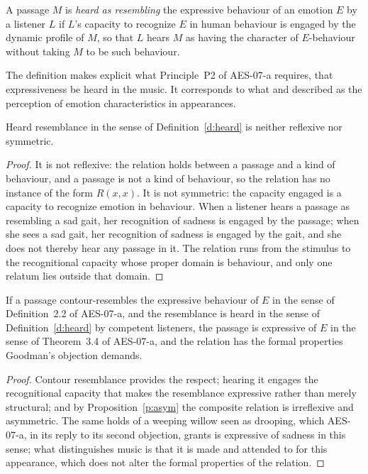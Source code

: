 \documentclass{situationist-preprint}
\begin{document}
\begin{definition}\label{d:heard}
A passage $M$ is \emph{heard as resembling} the expressive behaviour of an emotion $E$ by a listener $L$ if $L$'s capacity to recognize $E$ in human behaviour is engaged by the dynamic profile of $M$, so that $L$ hears $M$ as having the character of $E$-behaviour without taking $M$ to be such behaviour.
\end{definition}

The definition makes explicit what Principle~P2 of AES-07-a requires, that expressiveness be heard in the music. It corresponds to what \citet{Kivy1980} and \citet{SDavies1994} described as the perception of emotion characteristics in appearances.

\begin{proposition}\label{p:asym}
Heard resemblance in the sense of Definition~\ref{d:heard} is neither reflexive nor symmetric.
\end{proposition}

\begin{proof}
It is not reflexive: the relation holds between a passage and a kind of behaviour, and a passage is not a kind of behaviour, so the relation has no instance of the form $R(x,x)$. It is not symmetric: the capacity engaged is a capacity to recognize emotion in behaviour. When a listener hears a passage as resembling a sad gait, her recognition of sadness is engaged by the passage; when she sees a sad gait, her recognition of sadness is engaged by the gait, and she does not thereby hear any passage in it. The relation runs from the stimulus to the recognitional capacity whose proper domain is behaviour, and only one relatum lies outside that domain.
\end{proof}

\begin{proposition}\label{p:expr}
If a passage contour-resembles the expressive behaviour of $E$ in the sense of Definition~2.2 of AES-07-a, and the resemblance is heard in the sense of Definition~\ref{d:heard} by competent listeners, the passage is expressive of $E$ in the sense of Theorem~3.4 of AES-07-a, and the relation has the formal properties Goodman's objection demands.
\end{proposition}

\begin{proof}
Contour resemblance provides the respect; hearing it engages the recognitional capacity that makes the resemblance expressive rather than merely structural; and by Proposition~\ref{p:asym} the composite relation is irreflexive and asymmetric. The same holds of a weeping willow seen as drooping, which AES-07-a, in its reply to its second objection, grants is expressive of sadness in this sense; what distinguishes music is that it is made and attended to for this appearance, which does not alter the formal properties of the relation.
\end{proof}
\end{document}

